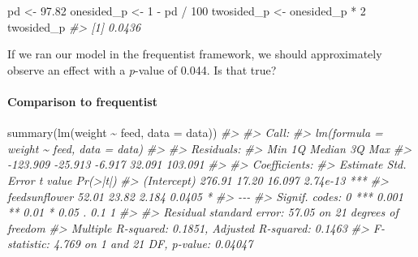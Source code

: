 \documentclass[10pt,a4paper,onecolumn]{article}
\newenvironment{Shaded}{\begin{snugshade}}{\end{snugshade}}
\newcommand{\AttributeTok}[1]{\textcolor[rgb]{0.77,0.63,0.00}{#1}}
\newcommand{\CommentTok}[1]{\textcolor[rgb]{0.56,0.35,0.01}{\textit{#1}}}
\newcommand{\DecValTok}[1]{\textcolor[rgb]{0.00,0.00,0.81}{#1}}
\newcommand{\FloatTok}[1]{\textcolor[rgb]{0.00,0.00,0.81}{#1}}
\newcommand{\FunctionTok}[1]{\textcolor[rgb]{0.00,0.00,0.00}{#1}}
\newcommand{\NormalTok}[1]{#1}
\newcommand{\OtherTok}[1]{\textcolor[rgb]{0.56,0.35,0.01}{#1}}
\newcommand{\SpecialCharTok}[1]{\textcolor[rgb]{0.00,0.00,0.00}{#1}}
\let\oldparagraph\paragraph
\renewcommand{\paragraph}[1]{\oldparagraph{#1}\mbox{}}
\begin{document}
\begin{Shaded}
\begin{Highlighting}[]
\NormalTok{pd }\OtherTok{\textless{}{-}} \FloatTok{97.82}
\NormalTok{onesided\_p }\OtherTok{\textless{}{-}} \DecValTok{1} \SpecialCharTok{{-}}\NormalTok{ pd }\SpecialCharTok{/} \DecValTok{100}
\NormalTok{twosided\_p }\OtherTok{\textless{}{-}}\NormalTok{ onesided\_p }\SpecialCharTok{*} \DecValTok{2}
\NormalTok{twosided\_p}
\CommentTok{\#\textgreater{} [1] 0.0436}
\end{Highlighting}
\end{Shaded}

If we ran our model in the frequentist framework, we should
approximately observe an effect with a \emph{p}-value of 0.044. Is that
true?

\hypertarget{comparison-to-frequentist}{%
\paragraph{Comparison to frequentist}\label{comparison-to-frequentist}}

\begin{Shaded}
\begin{Highlighting}[]
\FunctionTok{summary}\NormalTok{(}\FunctionTok{lm}\NormalTok{(weight }\SpecialCharTok{\textasciitilde{}}\NormalTok{ feed, }\AttributeTok{data =}\NormalTok{ data))}
\CommentTok{\#\textgreater{} }
\CommentTok{\#\textgreater{} Call:}
\CommentTok{\#\textgreater{} lm(formula = weight \textasciitilde{} feed, data = data)}
\CommentTok{\#\textgreater{} }
\CommentTok{\#\textgreater{} Residuals:}
\CommentTok{\#\textgreater{}      Min       1Q   Median       3Q      Max }
\CommentTok{\#\textgreater{} {-}123.909  {-}25.913   {-}6.917   32.091  103.091 }
\CommentTok{\#\textgreater{} }
\CommentTok{\#\textgreater{} Coefficients:}
\CommentTok{\#\textgreater{}               Estimate Std. Error t value Pr(\textgreater{}|t|)    }
\CommentTok{\#\textgreater{} (Intercept)     276.91      17.20  16.097 2.74e{-}13 ***}
\CommentTok{\#\textgreater{} feedsunflower    52.01      23.82   2.184   0.0405 *  }
\CommentTok{\#\textgreater{} {-}{-}{-}}
\CommentTok{\#\textgreater{} Signif. codes:  0 \textquotesingle{}***\textquotesingle{} 0.001 \textquotesingle{}**\textquotesingle{} 0.01 \textquotesingle{}*\textquotesingle{} 0.05 \textquotesingle{}.\textquotesingle{} 0.1 \textquotesingle{} \textquotesingle{} 1}
\CommentTok{\#\textgreater{} }
\CommentTok{\#\textgreater{} Residual standard error: 57.05 on 21 degrees of freedom}
\CommentTok{\#\textgreater{} Multiple R{-}squared:  0.1851, Adjusted R{-}squared:  0.1463 }
\CommentTok{\#\textgreater{} F{-}statistic: 4.769 on 1 and 21 DF,  p{-}value: 0.04047}
\end{Highlighting}
\end{Shaded}
\end{document}
